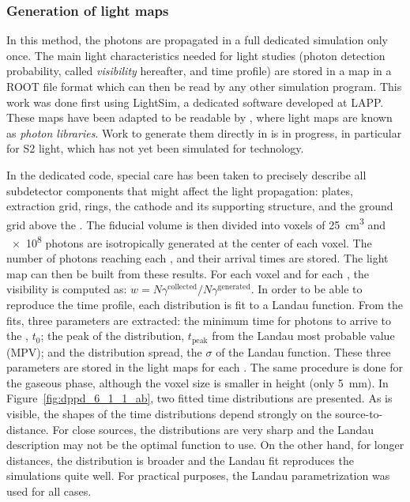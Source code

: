 \subsubsection{Generation of light maps}
\label{subsec:fddp-pd-6.1.1}

In this method, the photons are propagated in a full dedicated  simulation only once. The main light characteristics needed for light studies (photon detection probability, called \textit{visibility} hereafter, and time profile) are stored in a map in a ROOT \cite{root} file format which can then be read by any other simulation program. This work was done first using LightSim, a dedicated software developed at LAPP. These maps have been adapted to be readable by \larsoft, where light maps are known as \textit{photon libraries}. Work to generate them directly in \larsoft is in progress, in particular for S2 light, which has not yet been simulated for \dual technology.

In the dedicated   code, special care has been taken to precisely describe all subdetector components that might affect the light propagation:  plates, extraction grid,  rings, the cathode and its supporting structure, and the ground grid above the . The \lar fiducial volume is then divided into voxels of \SI{25}{cm^3} and \num{e8} photons are isotropically generated at the center of each voxel. The number of photons reaching each , and their arrival times are stored. The light map can then be built from these results. For each voxel and for each , the visibility is computed as: $w=N\gamma^{\textrm{collected}}/N\gamma^{\textrm{generated}}$. In order to be able to reproduce the time profile, each distribution is fit to a Landau function. From the fits, three parameters are extracted: the minimum time for photons to arrive to the , $t_0$; the peak of the distribution, $t_{\textrm{peak}}$ from the Landau most probable value (MPV); and the distribution spread, the $\sigma$ of the Landau function. These three parameters are stored in the light maps for each . The same procedure is done for the gaseous phase, although the voxel size is smaller in height (only \SI{5}{mm}). In Figure~\ref{fig:dppd_6_1_1_ab}, two fitted time distributions are presented. As is visible, the shapes of the time distributions depend strongly on the source-to- distance. For close sources, the distributions are very sharp and the Landau description may not be the optimal function to use. On the other hand, for longer distances, the distribution is broader and the Landau fit reproduces the simulations quite well. %
For practical purposes, the Landau parametrization was used for all cases.

